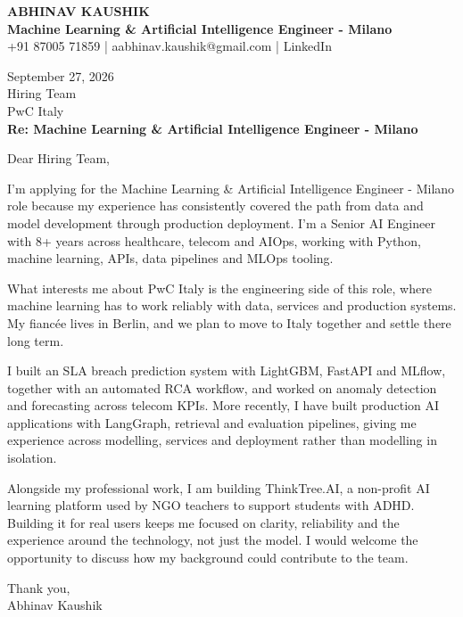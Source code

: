 \documentclass[10pt,a4paper]{article}
\begin{document}
\begin{center}
{\Large\bfseries ABHINAV KAUSHIK}\\[2pt]
{\bfseries Machine Learning \& Artificial Intelligence Engineer - Milano}\\[2pt]
+91 87005 71859 \quad | \quad aabhinav.kaushik@gmail.com \quad | \quad LinkedIn
\end{center}
\vspace{8pt}
September 27, 2026\\[6pt]
Hiring Team\\
PwC Italy\\[4pt]
\textbf{Re: Machine Learning \& Artificial Intelligence Engineer - Milano}

Dear Hiring Team,

I’m applying for the Machine Learning \& Artificial Intelligence Engineer - Milano role because my experience has consistently covered the path from data and model development through production deployment. I’m a Senior AI Engineer with 8+ years across healthcare, telecom and AIOps, working with Python, machine learning, APIs, data pipelines and MLOps tooling.

What interests me about PwC Italy is the engineering side of this role, where machine learning has to work reliably with data, services and production systems. My fiancée lives in Berlin, and we plan to move to Italy together and settle there long term.

I built an SLA breach prediction system with LightGBM, FastAPI and MLflow, together with an automated RCA workflow, and worked on anomaly detection and forecasting across telecom KPIs. More recently, I have built production AI applications with LangGraph, retrieval and evaluation pipelines, giving me experience across modelling, services and deployment rather than modelling in isolation.

Alongside my professional work, I am building ThinkTree.AI, a non-profit AI learning platform used by NGO teachers to support students with ADHD. Building it for real users keeps me focused on clarity, reliability and the experience around the technology, not just the model. I would welcome the opportunity to discuss how my background could contribute to the team.

Thank you,\\
Abhinav Kaushik
\end{document}
